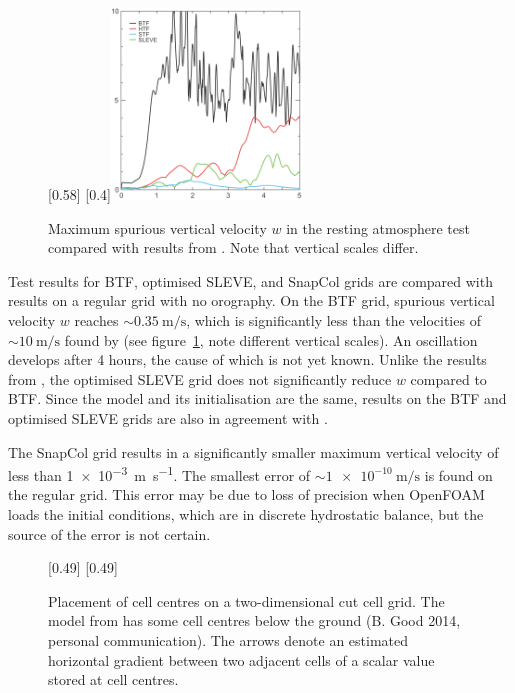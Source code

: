 \begin{figure}
	\captionsetup[subfigure]{position=b}
	\centering
	[0.58\textwidth]{}
	\hfill
	[0.4\textwidth]{\vspace{0.27in}\includegraphics[height=2in]{img/klemp-w.png}}
	\caption{Maximum spurious vertical velocity $w$ in the resting atmosphere test compared with results from \textcite{klemp2011}.  Note that vertical scales differ.}
	\label{fig:resting:w}
\end{figure}

Test results for BTF, optimised SLEVE, and SnapCol grids are compared with results on a regular grid with no orography.  On the BTF grid, spurious vertical velocity $w$ reaches $\sim \SI{0.35}{\meter\per\second}$, which is significantly less than the velocities of $\sim \SI{10}{\meter\per\second}$ found by \textcite{klemp2011} (see figure~\ref{fig:resting:w}, note different vertical scales).  An oscillation develops after 4 hours, the cause of which is not yet known.  Unlike the results from \textcite{klemp2011}, the optimised SLEVE grid does not significantly reduce $w$ compared to BTF.  Since the model and its initialisation are the same, results on the BTF and optimised SLEVE grids are also in agreement with \textcite{weller-shahrokhi2014}.

The SnapCol grid results in a significantly smaller maximum vertical velocity of less than \SI{1e-3}{\meter\per\second}.  The smallest error of $\sim \SI{1e-10}{\meter\per\second}$ is found on the regular grid.  This error may be due to loss of precision when OpenFOAM loads the initial conditions, which are in discrete hydrostatic balance, but the source of the error is not certain.

\begin{figure}
	\captionsetup[subfigure]{position=b}
	\centering
	[0.49\textwidth]{}
	\hfill
	[0.49\textwidth]{}
%
	\caption{Placement of cell centres on a two-dimensional cut cell grid.  The model from \textcite{good2013} has some cell centres below the ground (B. Good 2014, personal communication).  The arrows denote an estimated horizontal gradient between two adjacent cells of a scalar value stored at cell centres.}
	\label{fig:resting:good}
\end{figure}

